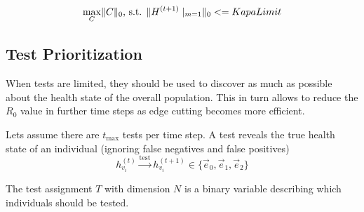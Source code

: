 \begin{equation}
	\max_{C} \lVert C\rVert_0\text{, s.t. } \lVert H^{(t+1)}\mid_{m=1}\rVert_{0} <= KapaLimit
\end{equation}


\subsection{Test Prioritization}
When tests are limited, they should be used to discover as much as possible about the health state of the overall population.
This in turn allows to reduce the $R_0$ value in further time steps as edge cutting becomes more efficient.

Lets assume there are $t_{\text{max}}$ tests per time step.
A test reveals the true health state of an individual (ignoring false negatives and false positives)
\begin{equation}
	h_{{v}_i}^{(t)} \xrightarrow{\text{test}} h_{{v}_i}^{(t+1)} \in \{\vec{e}_0, \vec{e}_1, \vec{e}_2 \}
\end{equation}

The test assignment $T$ with dimension $N$ is a binary variable describing which individuals should be tested.